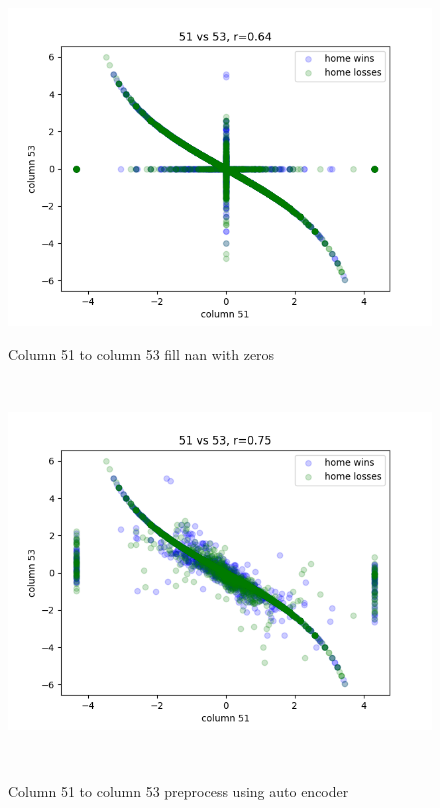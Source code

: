 \documentclass[11pt,a4paper]{article}
\begin{document}
\begin{figure}[ht]
    \centering
    \begin{minipage}{.2\textwidth}
        \centering
        \includegraphics[width=0.8\linewidth]{images/0.64r_51_to_53.png}
        \caption[width=0.8\linewidth]{Column 51 to column 53 fill nan with zeros}
        \label{fig:51-53}
    \end{minipage}%
    \begin{minipage}{.05\textwidth}
        \ 
    \end{minipage}%
    \begin{minipage}{.2\textwidth}
        \centering
        \includegraphics[width=0.8\linewidth]{images/0.75r_51_to_53_recovered.png}
        \caption[width=0.8\linewidth]{Column 51 to column 53 preprocess using auto encoder}
        \label{fig:51-53r}
    \end{minipage}%
    \begin{minipage}{.05\textwidth}
        \ 
    \end{minipage}%
    \begin{minipage}{.2\textwidth}

\end{minipage}
\end{figure}
\end{document}

